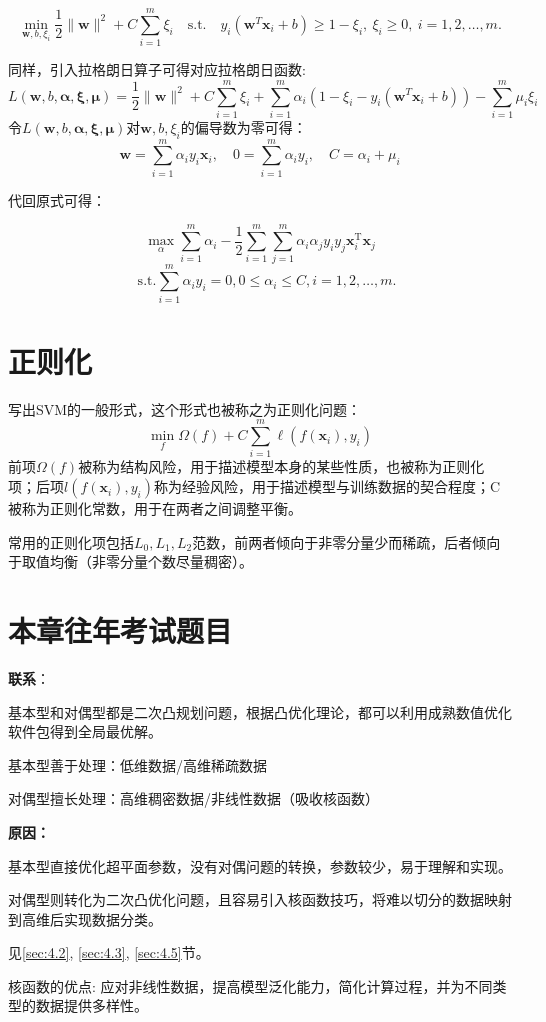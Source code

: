 \[
\min_{\boldsymbol w, b, \xi_i} \frac{1}{2}\| \boldsymbol w\|^2+C\sum_{i=1}^{m}\xi_i \quad \text{s.t.}\quad y_i(\boldsymbol w^T \boldsymbol x_i + b) \geq 1-\xi_i, \ \xi_i\ge 0, \ i = 1, 2, \ldots, m.
\]

同样，引入拉格朗日算子可得对应拉格朗日函数:
\[
L(\boldsymbol{w}, b, \boldsymbol{\alpha}, \boldsymbol \xi , \boldsymbol \mu)=\frac{1}{2}\|\boldsymbol{w}\|^{2}+ C\sum_{i=1}^{m}\xi_i +\sum_{i=1}^{m} \alpha_{i}\left(1- \xi_i - y_{i}\left(\boldsymbol{w}^{T} \boldsymbol{x}_{i}+b\right)\right) - \sum_{i=1}^m\mu_i\xi_i
\]
令$L(\boldsymbol{w}, b, \boldsymbol{\alpha}, \boldsymbol \xi , \boldsymbol \mu)$对$\boldsymbol w, b, \xi_i$的偏导数为零可得：
\[
\boldsymbol{w}=\sum_{i=1}^{m} \alpha_{i} y_{i} \boldsymbol{x}_{i}, \quad 0=\sum_{i=1}^{m} \alpha_{i} y_{i}, \quad C = \alpha_i+\mu_i
\]

代回原式可得：

\[
\max_{\alpha} \sum_{i=1}^m\alpha_i - \frac{1}{2}\sum_{i=1}^{m}\sum_{j=1}^m \alpha_i\alpha_j y_i y_j\boldsymbol x_i^{\mathrm{T}}\boldsymbol x_j \]
\[\quad \text{s.t.}\sum_{i=1}^m\alpha_iy_i = 0, 0 \le \alpha_i \le C, i= 1, 2, \ldots, m.
\]

\section{正则化}\label{sec:4.7}

写出SVM的一般形式，这个形式也被称之为正则化问题：
\[
\min _{f} \Omega(f)+C \sum_{i=1}^{m} \ell\left(f\left(\boldsymbol{x}_{i}\right), y_{i}\right)
\]
前项$\Omega(f)$被称为结构风险，用于描述模型本身的某些性质，也被称为正则化项；后项$l(f(\boldsymbol x_i), y_i)$称为经验风险，用于描述模型与训练数据的契合程度；C被称为正则化常数，用于在两者之间调整平衡。

常用的正则化项包括$L_0, L_1, L_2$范数，前两者倾向于非零分量少而稀疏，后者倾向于取值均衡（非零分量个数尽量稠密）。

\section{本章往年考试题目}\label{sec:4.8}

\textbf{联系}：

基本型和对偶型都是二次凸规划问题，根据凸优化理论，都可以利用成熟数值优化软件包得到全局最优解。

基本型善于处理：低维数据/高维稀疏数据

对偶型擅长处理：高维稠密数据/非线性数据（吸收核函数）

\textbf{原因：}

基本型直接优化超平面参数，没有对偶问题的转换，参数较少，易于理解和实现。

对偶型则转化为二次凸优化问题，且容易引入核函数技巧，将难以切分的数据映射到高维后实现数据分类。


见\ref{sec:4.2}, \ref{sec:4.3}, \ref{sec:4.5}节。

核函数的优点: 应对非线性数据，提高模型泛化能力，简化计算过程，并为不同类型的数据提供多样性。